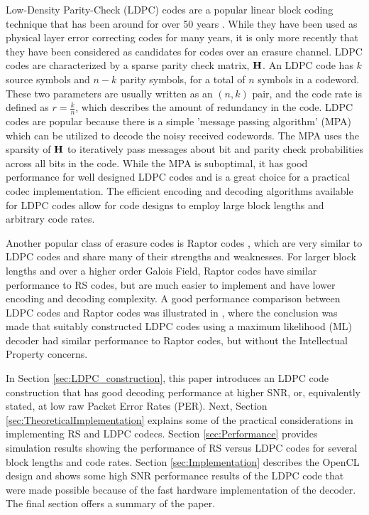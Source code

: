\documentclass[conference]{IEEEtran}
\begin{document}
Low-Density Parity-Check (LDPC) codes are a popular linear block coding technique that has been around for over 50 years \cite{Gallager-62}.  While they have been used as physical layer error correcting codes for many years, it is only more recently that they have been considered as candidates for codes over an erasure channel.  LDPC codes are characterized by a sparse parity check matrix, $\bf{H}$.  An LDPC code has $k$ source symbols and $n-k$ parity symbols, for a total of $n$ symbols in a codeword.  These two parameters are usually written as an $(n, k)$ pair, and the code rate is defined as $r=\frac{k}{n}$, which describes the amount of redundancy in the code.  LDPC codes are popular because there is a simple 'message passing algorithm' (MPA) which can be utilized to decode the noisy received codewords.  The MPA uses the sparsity of $\bf{H}$ to iteratively pass messages about bit and parity check probabilities across all bits in the code.  While the MPA is suboptimal, it has good performance for well designed LDPC codes and is a great choice for a practical codec implementation.  The efficient encoding and decoding algorithms available for LDPC codes allow for code designs to employ large block lengths and arbitrary code rates.

Another popular class of erasure codes is Raptor codes \cite{Shokrollahi-06}, which are very similar to LDPC codes and share many of their strengths and weaknesses.  For larger block lengths and over a higher order Galois Field, Raptor codes have similar performance to RS codes, but are much easier to implement and have lower encoding and decoding complexity.  A good performance comparison between LDPC codes and Raptor codes was illustrated in \cite{Roca-2013}, where the conclusion was made that suitably constructed LDPC codes using a maximum likelihood (ML) decoder had similar performance to Raptor codes, but without the Intellectual Property concerns.

In Section \ref{sec:LDPC_construction}, this paper introduces an LDPC code construction that has good decoding performance at higher SNR, or, equivalently stated, at low raw Packet Error Rates (PER).  Next, Section \ref{sec:TheoreticalImplementation} explains some of the practical considerations in implementing RS and LDPC codecs.  Section \ref{sec:Performance} provides simulation results showing the performance of RS versus LDPC codes for several block lengths and code rates.  Section \ref{sec:Implementation} describes the OpenCL design and shows some high SNR performance results of the LDPC code that were made possible because of the fast hardware implementation of the decoder.  The final section offers a summary of the paper.
\end{document}
